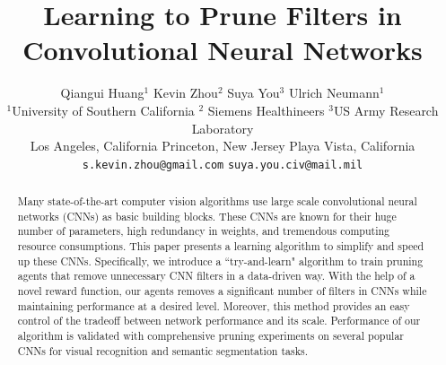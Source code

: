 \documentclass[10pt,twocolumn,letterpaper]{article}
\begin{document}
\title{Learning to Prune Filters in Convolutional Neural Networks}


\author{Qiangui Huang$^1$
 \qquad Kevin Zhou$^2$ \qquad Suya You$^3$ \qquad Ulrich Neumann$^1$\\
$^1$University of Southern California \hspace{5mm}  $^2$ Siemens Healthineers \hspace{5mm}  $^3$US Army Research Laboratory\\
\hspace{2mm}Los Angeles, California \hspace{12mm} Princeton, New Jersey \hspace{10mm} Playa Vista, California\\
\hspace{10mm}  {\tt\small s.kevin.zhou@gmail.com}\hspace{10mm}  {\tt\small suya.you.civ@mail.mil}\qquad
}


\maketitle
\ifwacvfinal\thispagestyle{empty}\fi

\begin{abstract}
Many state-of-the-art computer vision algorithms use large scale convolutional neural networks (CNNs) as basic building blocks. These CNNs are known for their huge number of parameters, high redundancy in weights, and tremendous computing resource consumptions. This paper presents a learning algorithm to simplify and speed up these CNNs. Specifically, we introduce a ``try-and-learn" algorithm to train pruning agents that remove unnecessary CNN filters in a data-driven way. With the help of a novel reward function, our agents removes a significant number of filters in CNNs while maintaining performance at a desired level. Moreover, this method provides an easy control of the tradeoff between network performance and its scale. Performance of our algorithm is validated with comprehensive pruning experiments on several popular CNNs for visual recognition and semantic segmentation tasks. 
\end{abstract}
\end{document}

